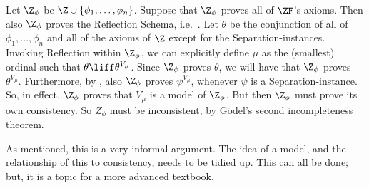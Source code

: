 \documentclass[../../../include/open-logic-section]{subfiles}
\begin{document}
Let $\Z_\phi$ be $\Z \cup \{\phi_1, \ldots, \phi_n\}$. Suppose that $\Z_\phi$ proves all of $\ZF$'s axioms. Then also $\Z_\phi$ proves the Reflection Schema, i.e.\ . Let $\theta$ be the conjunction of all of $\phi_1, \ldots, \phi_n$ and all of the axioms of $\Z$ except for the Separation-instances. Invoking Reflection within $\Z_\phi$, we can explicitly define $\mu$ as the (smallest) ordinal such that $\theta \liff \theta^{V_\mu}$. Since $\Z_\phi$ proves $\theta$, we will have that $\Z_\phi$ proves $\theta^{V_\mu}$. Furthermore, by , also $\Z_\phi$ proves $\psi^{V_\mu}$, whenever $\psi$ is a Separation-instance. So, in effect, $\Z_\phi$ proves that $V_\mu$ is a model of $\Z_\phi$. But then $\Z_\phi$ must prove its own consistency. So $Z_\phi$ must be inconsistent, by G\"odel's second incompleteness theorem. 

As mentioned, this is a very informal argument. The idea of a model, and the relationship of this to consistency, needs to be tidied up. This can all be done; but, it is a topic for a more advanced textbook. 
\end{document}
